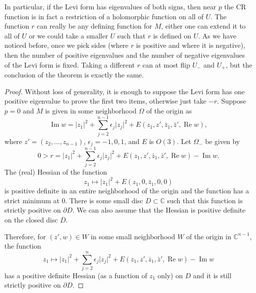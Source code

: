 \documentclass[12pt,openany]{book}
\renewcommand{\Re}{\operatorname{Re}}
\renewcommand{\Im}{\operatorname{Im}}
\newcommand{\sabs}[1]{\lvert {#1} \rvert}
\newcommand{\C}{{\mathbb{C}}}
\theoremstyle{plain}
\theoremstyle{remark}
\theoremstyle{definition}
\theoremstyle{exercise}
\theoremstyle{example}
\begin{document}
In particular, if the Levi form has eigenvalues of both signs,
then near $p$ the CR function is in fact a restriction of a holomorphic
function on all of $U$.  The function $r$ can really be any defining
function for $M$, either one can extend it to all of $U$ or we could take a
smaller $U$ such that $r$ is defined on $U$.  As we have noticed before,
once we pick sides (where $r$ is positive and where it is negative), then
the number of positive eigenvalues and the number of negative eigenvalues of
the Levi form is fixed.  Taking a different $r$ can at most flip $U_-$
and $U_+$, but the conclusion of the theorem is exactly the same.

\begin{proof}
Without loss of generality, it is enough to suppose the Levi form has one positive eigenvalue to prove the
first two items, otherwise just take $-r$.
Suppose $p = 0$ and $M$ is given in some neighborhood
$\Omega$ of the origin as
\begin{equation*}
\Im w = \sabs{z_1}^2 + \sum_{j=2}^{n-1} \epsilon_j \sabs{z_j}^2 +
E(z_1,z',\bar{z}_1,\bar{z}',\Re w) ,
\end{equation*}
where $z' = (z_2,\ldots,z_{n-1})$, $\epsilon_j = -1,0,1$,
and $E$ is $O(3)$.
Let $\Omega_-$ be given by
\begin{equation*}
0 > r = \sabs{z_1}^2 + \sum_{j=2}^{n-1} \epsilon_j \sabs{z_j}^2 +
E(z_1,z',\bar{z}_1,\bar{z}',\Re w) - \Im w .
\end{equation*}
The (real) Hessian of the function
\begin{equation*}
z_1 \mapsto \sabs{z_1}^2 +
E(z_1,0,\bar{z}_1,0,0) 
\end{equation*}
is positive definite in an entire
neighborhood of the origin and the function has a strict minimum at 0.
There is some small disc $D \subset \C$ such
that this function is strictly positive on $\partial D$.  We can also assume
that the Hessian is positive definite on the closed disc $\overline{D}$.

Therefore,
for $(z',w) \in W$ in some small neighborhood $W$ of the origin in $\C^{n-1}$, the 
function
\begin{equation*}
z_1 \mapsto \sabs{z_1}^2 + \sum_{j=2}^n \epsilon_j \sabs{z_j}^2 +
E(z_1,z',\bar{z}_1,\bar{z}',\Re w) - \Im w
\end{equation*}
has a positive definite Hessian (as a function of $z_1$ only) on $D$ and
it is still strictly positive on $\partial D$.


\end{proof}
\end{document}
